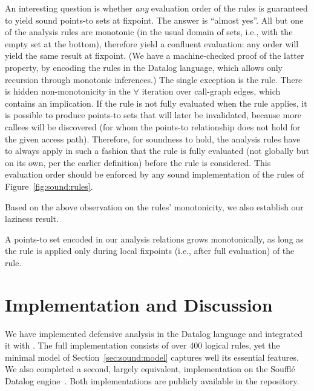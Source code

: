 An interesting question is whether \emph{any} evaluation order of the rules is guaranteed to yield sound points-to sets at fixpoint. The answer is ``almost yes''. All but one of the analysis rules are monotonic (in the usual domain of sets, i.e., with the empty set at the bottom), therefore yield a confluent evaluation: any order will yield the same result at fixpoint. (We have a machine-checked proof of the latter property, by encoding the rules in the Datalog language, which allows only recursion through monotonic inferences.) The single exception is the  rule. There is hidden non-monotonicity in the $\forall$ iteration over call-graph edges, which contains an implication. If the  rule is not fully evaluated when the  rule applies, it is possible to produce points-to sets that will later be invalidated, because more callees will be discovered (for whom the points-to relationship does not hold for the given access path). Therefore, for soundness to hold, the analysis rules have to always apply in such a fashion that the  rule is fully evaluated (not globally but on its own, per the earlier definition) before the  rule is considered. This evaluation order should be enforced by any sound implementation of the rules of Figure~\ref{fig:sound:rules}.

Based on the above observation on the rules' monotonicity, we also establish our laziness result.

\begin{theorem}
A points-to set encoded in our analysis relations grows monotonically, as long as the  rule is applied only during local fixpoints (i.e., after full evaluation) of the  rule.
\end{theorem}


\section{Implementation and Discussion}
\label{sec:sound:discussion}

We have implemented defensive analysis in the Datalog language and integrated it with \doop{}. The full implementation consists of over 400 logical rules, yet the minimal model of Section~\ref{sec:sound:model} captures well its essential features. We also completed a second, largely equivalent, implementation on the Souffl\'{e} Datalog engine~\cite{cc:2016:Scholz}. Both implementations are publicly available in the \doop{} repository.

